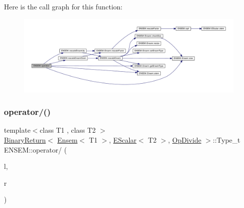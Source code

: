 Here is the call graph for this function\+:\nopagebreak
\begin{figure}[H]
\begin{center}
\leavevmode
\includegraphics[width=350pt]{d1/d9e/group__eensem_ga4294d59488c65a0e8cb9e552578bfd86_cgraph}
\end{center}
\end{figure}
\mbox{\label{group__eensem_ga77b1f275ee5f8d89819ec03dab4ff756}} 
\subsubsection{\texorpdfstring{operator/()}{operator/()}\hspace{0.1cm}{\footnotesize\ttfamily [2/3]}}
{\footnotesize\ttfamily template$<$class T1 , class T2 $>$ \\
\mbox{\hyperlink{structENSEM_1_1BinaryReturn}{Binary\+Return}}$<$ \mbox{\hyperlink{classENSEM_1_1Ensem}{Ensem}}$<$ T1 $>$, \mbox{\hyperlink{classENSEM_1_1EScalar}{E\+Scalar}}$<$ T2 $>$, \mbox{\hyperlink{structENSEM_1_1OpDivide}{Op\+Divide}} $>$\+::Type\+\_\+t E\+N\+S\+E\+M\+::operator/ (\begin{DoxyParamCaption}\item[{const \mbox{\hyperlink{classENSEM_1_1Ensem}{Ensem}}$<$ T1 $>$ \&}]{l,  }\item[{const \mbox{\hyperlink{classENSEM_1_1EScalar}{E\+Scalar}}$<$ T2 $>$ \&}]{r }\end{DoxyParamCaption})\hspace{0.3cm}{\ttfamily [inline]}}

